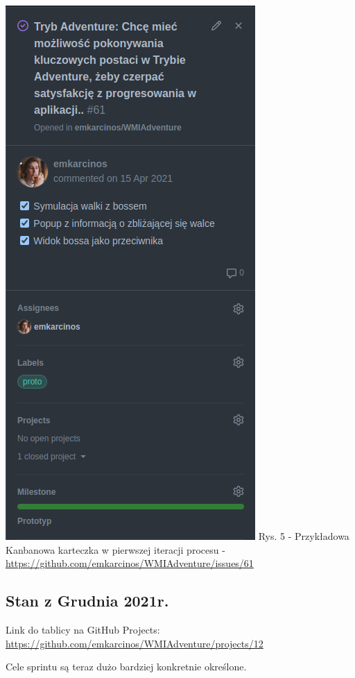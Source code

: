 \documentclass{article}
\begin{document}
\begin{center}
    \includegraphics[scale=0.7]{card_initial_example.png}
    \newline
    Rys. 5 - Przykładowa Kanbanowa karteczka w pierwszej iteracji procesu - \url{https://github.com/emkarcinos/WMIAdventure/issues/61}
\end{center}

\subsection*{Stan z Grudnia 2021r.}
Link do tablicy na GitHub Projects: \url{https://github.com/emkarcinos/WMIAdventure/projects/12}

Cele sprintu są teraz dużo bardziej konkretnie określone.
\end{document}
